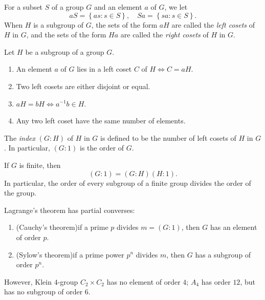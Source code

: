 \begin{definition}
  \label{definition-coset}
  For a subset \( S \) of a group \( G \) and an element \( a \) of \( G \), we let
  \[
    aS = \left\lbrace as: s \in S \right\rbrace,\quad Sa = \left\lbrace sa: s \in S \right\rbrace.
  \]
  When \( H \) is a subgroup of \( G \), the sets of the form \( aH \) are called the \emph{left cosets} of \( H \) in \( G \), and the sets of the form \( Ha \) are called the \emph{right cosets} of \( H \) in \( G \).
\end{definition}

\begin{proposition}
  \label{proposition-coset-properties}
  Let \( H \) be a subgroup of a group \( G \).
  \begin{enumerate}
    \item An element \( a \) of \( G \) lies in a left coset \( C \) of \( H \iff C = aH \).
    \item Two left cosets are either disjoint or equal.
    \item \( a H = b H \iff a^{-1}b \in H \).
    \item Any two left coset have the same number of elements.
  \end{enumerate}
\end{proposition}

\begin{definition}
  \label{definition-index}
  The \emph{index} \( (G: H) \) of \( H \) in \( G \) is defined to be the number of left cosets of \( H \) in \( G \).
  In particular, \( (G: 1) \) is the order of \( G \).
\end{definition}

\begin{theorem}[Lagrange]
  \label{theorem-Lagrange}
  If \( G \) is finite, then
  \[
    (G : 1) = (G : H)(H : 1).
  \]
  In particular, the order of every subgroup of a finite group divides the order of the group.
\end{theorem}
\begin{remark}
  \label{remark-Lagrange-converses}
  Lagrange's theorem has partial converses:
  \begin{enumerate}
    \item (Cauchy's theorem)if a prime \( p \) divides \( m = (G: 1) \), then \( G \) has an element of order \( p \).
    \item (Sylow's theorem)if a prime power \( p^n \) divides \( m \), then \( G \) has a subgroup of order \( p^n \).
  \end{enumerate}
  However, Klein \( 4 \)-group \( C_2 \times C_2 \) has no element of order \( 4 \); \( A_4 \) has order \( 12 \), but has no subgroup of order \( 6 \).
\end{remark}

